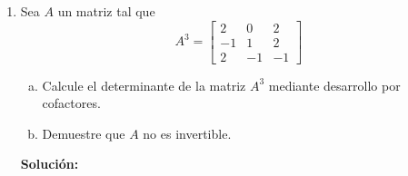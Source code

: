\documentclass[12pt]{article}
\newenvironment{solucion}
{\begin{mdframed}[backgroundcolor=black!10]
		{\bf Solución:}\\
	}
	{
	\end{mdframed}
}
\newenvironment{preguntas}
{\begin{enumerate}\itemsep12pt
	}
	{
	\end{enumerate}
}
\begin{document}
\begin{preguntas}
\begin{solucion}
\begin{enumerate}[a)]
$$\begin{pmatrix}
			\end{pmatrix}$$
			Por lo que
			$$A_T = \begin{bmatrix}
			1 & 1 & 0 \\
			0 & 1 & 1 \\
			1 & 0 & -1 
			\end{bmatrix}$$
			Luego, el volumen de $T(P)$ será $|det(A_P)| \cdot |det(A_T)|$
			$$|det(A_T)| = \left| det \left(\begin{bmatrix}
			1 & 1 & 0 \\
			0 & 1 & 1 \\
			1 & 0 & -1 
			\end{bmatrix}\right)\right| = |1(-1-0) - (0 - 1)| = |1-1| = 0$$
			Finalmente,
			$$V(T(P)) = |det(A_P)| \cdot |det(A_T)| = 15 \cdot 0 = 0$$
\end{enumerate}
\end{solucion}
\item Sea $A$ un matriz tal que
$$A^3 = 
\begin{bmatrix}
2 & 0 & 2\\
-1 & 1 & 2\\
2 & -1 & -1
\end{bmatrix}$$
\begin{enumerate}[a)]
\item Calcule el determinante de la matriz $A^3$ mediante desarrollo por cofactores.
\item Demuestre que $A$ no es invertible.
\end{enumerate}
\begin{solucion}


\end{solucion}
\end{preguntas}
\end{document}
